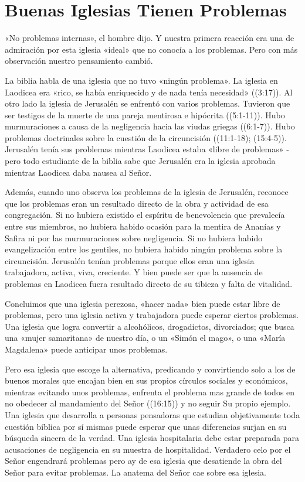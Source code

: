 \documentclass[12pt, twoside, openright]{book}
\begin{document}
\section{Buenas Iglesias Tienen Problemas}
«No problemas internas», el hombre dijo. Y nuestra primera reacción era una de admiración por esta iglesia «ideal» que no conocía a los problemas. Pero con más observación nuestro pensamiento cambió. 

La biblia habla de una iglesia que no tuvo «ningún problema». La iglesia en Laodicea era «rico, se había enriquecido y de nada tenía necesidad» ((3:17)). Al otro lado la iglesia de Jerusalén se enfrentó con varios problemas. Tuvieron que ser testigos de la muerte de una pareja mentirosa e hipócrita ((5:1-11)). Hubo murmuraciones a causa de la negligencia hacia las viudas griegas ((6:1-7)). Hubo problemas doctrinales sobre la cuestión de la circuncisión ((11:1-18); (15:4-5)). Jerusalén tenía sus problemas mientras Laodicea estaba «libre de problemas» - pero todo estudiante de la biblia sabe que Jerusalén era la iglesia aprobada mientras Laodicea daba nausea al Señor. 

Además, cuando uno observa los problemas de la iglesia de Jerusalén, reconoce que los problemas eran un resultado directo de la obra y actividad de esa congregación. Si no hubiera existido el espíritu de benevolencia que prevalecía entre sus miembros, no hubiera habido ocasión para la mentira de Ananías y Safira ni por las murmuraciones sobre negligencia. Si no hubiera habido evangelización entre los gentiles, no hubiera habido ningún problema sobre la circuncisión. Jerusalén tenían problemas porque ellos eran una iglesia trabajadora, activa, viva, creciente. Y bien puede ser que la ausencia de problemas en Laodicea fuera resultado directo de su tibieza y falta de vitalidad.

Concluimos que una iglesia perezosa, «hacer nada» bien puede estar libre de problemas, pero una iglesia activa y trabajadora puede esperar ciertos problemas. Una iglesia que logra convertir a alcohólicos, drogadictos, divorciados; que busca una «mujer samaritana» de nuestro día, o un «Simón el mago», o una «María Magdalena» puede anticipar unos problemas.

Pero esa iglesia que escoge la alternativa, predicando y convirtiendo solo a los de buenos morales que encajan bien en sus propios círculos sociales y económicos, mientras evitando unos problemas, enfrenta el problema mas grande de todos en no obedecer al mandamiento del Señor ((16:15)) y no seguir Su propio ejemplo. Una iglesia que desarrolla a personas pensadoras que estudian objetivamente toda cuestión bíblica por sí mismas puede esperar que unas diferencias surjan en su búsqueda sincera de la verdad. Una iglesia hospitalaria debe estar preparada para acusaciones de negligencia en su muestra de hospitalidad. Verdadero celo por el Señor engendrará problemas pero ay de esa iglesia que desatiende la obra del Señor para evitar problemas. La anatema del Señor cae sobre esa iglesia. 
\end{document}
